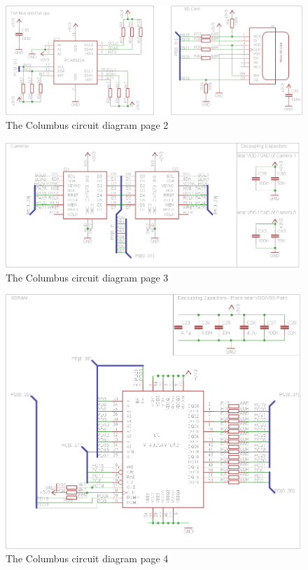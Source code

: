 \begin{figure}[ht!]
\centering
\includegraphics[angle = 90, width=\textwidth,height=\textheight,keepaspectratio]{./Figures/ColumbusCircuitPage2.png}
\caption{The Columbus circuit diagram page 2}
\label{sch:Columbus_Schematic:2}
\end{figure}

\begin{figure}[ht!]
\centering
\includegraphics[angle = 90, width=\textwidth,height=\textheight,keepaspectratio]{./Figures/ColumbusCircuitPage3.png}
\caption{The Columbus circuit diagram page 3}
\label{sch:Columbus_Schematic:3}
\end{figure}

\begin{figure}[ht!]
\centering
\includegraphics[angle = 90, width=\textwidth,height=\textheight,keepaspectratio]{./Figures/ColumbusCircuitPage4.png}
\caption{The Columbus circuit diagram page 4}
\label{sch:Columbus_Schematic:4}
\end{figure}

